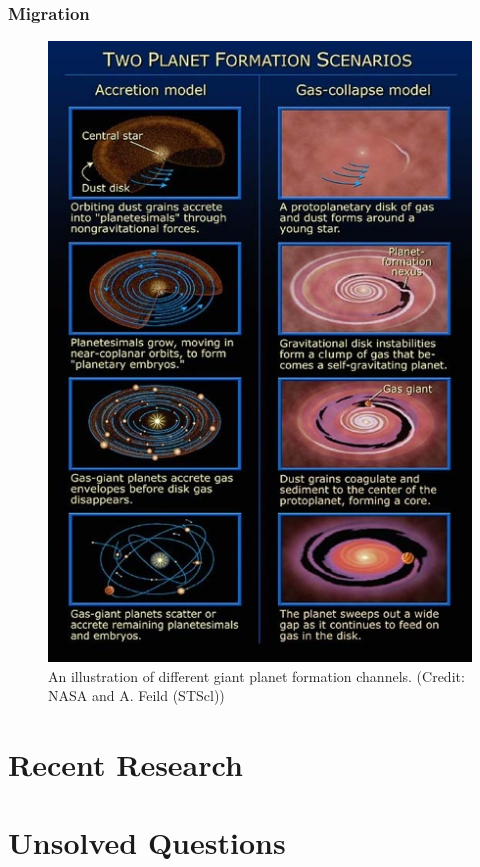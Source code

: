 \documentclass[twocolumn]{aastex631}
\begin{document}
\subsubsection{Migration}

\begin{figure}[b]
    \centering
    \includegraphics[width=\columnwidth]{channels_illustration.jpg}
    \caption{An illustration of different giant planet formation channels. (Credit: NASA and A. Feild (STScl))}
    \label{fig:formation_diagram}
\end{figure}

\section{Recent Research}

\section{Unsolved Questions}
\end{document}
